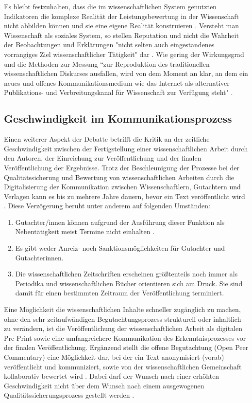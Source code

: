 Es bleibt festzuhalten, dass die im wissenschaftlichen System genutzten Indikatoren die komplexe Realität der Leistungsbewertung in der Wissenschaft nicht abbilden können und sie eine eigene Realität konstruieren \cite{Hornbostel_1997}. Versteht man Wissenschaft als soziales System, so stellen Reputation und nicht die Wahrheit der Beobachtungen und Erklärungen "nicht selten auch eingestandenes vorrangiges Ziel wissenschaftlicher Tätigkeit" dar \cite{luhmann_1970_selbststeuerung}. Wie gering der Wirkungsgrad und die Methoden zur Messung “zur Reproduktion des traditionellen wissenschaftlichen Diskurses ausfallen, wird von dem Moment an klar, an dem ein neues und offenes Kommunikationsmedium wie das Internet als alternativer Publikations- und Verbreitungskanal für Wissenschaft zur Verfügung steht" \cite{Rost_1998}.

\subsection{Geschwindigkeit im Kommunikationsprozess}

Einen weiterer Aspekt der Debatte betrifft die Kritik an der zeitliche Geschwindigkeit zwischen der Fertigstellung einer wissenschaftlichen Arbeit durch den Autoren, der Einreichung zur Veröffentlichung und der finalen Veröffentlichung der Ergebnisse. Trotz der Beschleunigung der Prozesse bei der Qualitätssicherung und Bewertung von wissenschaftlichen Arbeiten durch die Digitalisierung der Kommunikation zwischen Wissenschaftlern, Gutachtern und Verlagen kann es bis zu mehrere Jahre dauern, bevor ein Text veröffentlicht wird \cite{nosek_2012_scientific}. Diese Verzögerung beruht unter anderem auf folgenden Umständen:

\begin{enumerate}
\item Gutachter/innen können aufgrund der Ausführung dieser Funktion als Nebentätigkeit meist Termine nicht einhalten \cite{bar_2009_wissenschaftliche}.
\item Es gibt weder Anreiz- noch Sanktionsmöglichkeiten für Gutachter und Gutachterinnen.
\item Die wissenschaftlichen Zeitschriften erscheinen größtenteils noch immer als Periodika und wissenschaftlichen Bücher orientieren sich am Druck. Sie sind damit für einen bestimmten Zeitraum der Veröffentlichung terminiert.
\end{enumerate}

Eine Möglichkeit die wissenschaftlichen Inhalte schneller zugänglich zu machen, ohne den sehr zeitaufwändigen Begutachtungsprozess strukturell oder inhaltlich zu verändern, ist die Veröffentlichung der wissenschaftlichen Arbeit als digitalen Pre-Print sowie eine umfangreichere Kommunikation des Erkenntnisprozesses vor der finalen Veröffentlichung. Ergänzend stellt die offene Begutachtung (Open Peer Commentary) eine Möglichkeit dar, bei der ein Text anonymisiert (vorab) veröffentlicht und kommuniziert, sowie von der wissenschaftlichen Gemeinschaft kollaborativ bewertet wird \cite{mueller_2009_peerreview}. Dabei darf der Wunsch nach einer erhöhten Geschwindigkeit nicht über dem Wunsch nach einem ausgewogenen Qualitätssicherungsprozess gestellt werden \cite{Beall_2012}.

